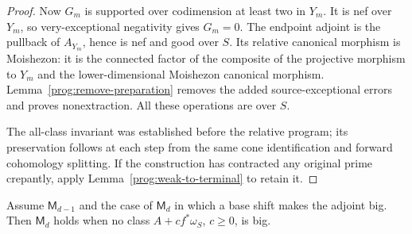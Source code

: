 \begin{proof}
Now $G_m$ is supported over codimension at least two in $Y_m$.
It is nef over $Y_m$, so very-exceptional negativity gives $G_m=0$.
The endpoint adjoint is the pullback of $A_{Y_m}$, hence is nef and
good over $S$. Its relative canonical morphism is Moishezon: it is
the connected factor of the composite of the projective morphism to
$Y_m$ and the lower-dimensional Moishezon canonical morphism.
Lemma~\ref{prog:remove-preparation} removes the added
source-exceptional errors and proves nonextraction. All these operations are over $S$.

The all-class invariant was established before the relative program;
its preservation follows at each step from the same cone identification
and forward cohomology splitting. If the construction has contracted
any original prime crepantly, apply
Lemma~\ref{prog:weak-to-terminal} to retain it.
\end{proof}

\begin{lemma}
\label{prog:relative-model}
Assume $\mathsf M_{d-1}$ and the case of $\mathsf M_d$ in which a
base shift makes the adjoint big. Then $\mathsf M_d$ holds when no
class $A+c f^*\omega_S$, $c\geq0$, is big.
\end{lemma}

